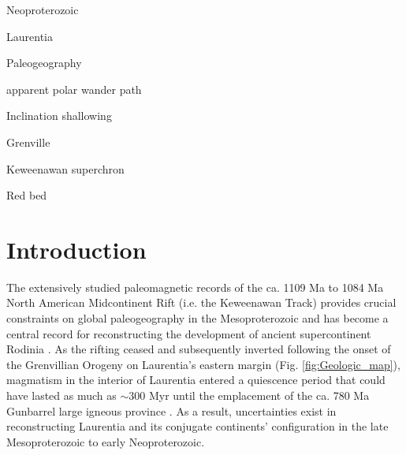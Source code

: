 \documentclass[draft]{agujournal2019}
\begin{document}


\begin{keypoints}
\item Neoproterozoic
\item Laurentia  
\item Paleogeography
\item apparent polar wander path
\item Inclination shallowing
\item Grenville
\item Keweenawan superchron
\item Red bed
\end{keypoints}

\section*{Introduction}

The extensively studied paleomagnetic records of the ca. 1109 Ma to 1084 Ma North American Midcontinent Rift (i.e. the Keweenawan Track) provides crucial constraints on global paleogeography in the Mesoproterozoic and has become a central record for reconstructing the development of ancient supercontinent Rodinia \cite{Swanson-Hysell2019a, Swanson-Hysell2021c}. As the rifting ceased and subsequently inverted following the onset of the Grenvillian Orogeny on Laurentia's eastern margin (Fig. \ref{fig:Geologic_map}), magmatism in the interior of Laurentia entered a quiescence period that could have lasted as much as $\sim$300 Myr until the emplacement of the ca. 780 Ma Gunbarrel large igneous province \cite{Harlan2003a}. As a result, uncertainties exist in reconstructing Laurentia and its conjugate continents' configuration in the late Mesoproterozoic to early Neoproterozoic. 
\end{document}

